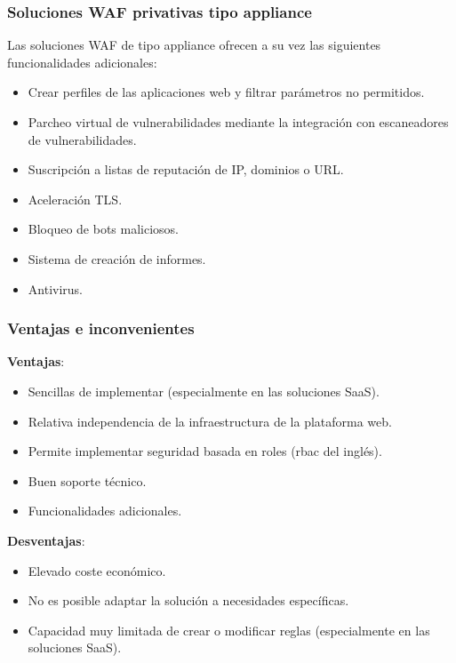 \begin{frame}[shrink]
  \frametitle{Soluciones WAF privativas tipo appliance}
  Las soluciones WAF de tipo appliance ofrecen a su vez las siguientes funcionalidades adicionales:
  \begin{itemize}
    \item Crear perfiles de las aplicaciones web y filtrar parámetros no permitidos.
    \item Parcheo virtual de vulnerabilidades mediante la integración con escaneadores de vulnerabilidades.
    \item Suscripción a listas de reputación de IP, dominios o URL.
    \item Aceleración TLS.
    \item Bloqueo de bots maliciosos.
    \item Sistema de creación de informes.
    \item Antivirus.
  \end{itemize}
\end{frame}

\begin{frame}[shrink]
  \frametitle{Ventajas e inconvenientes}
  {\bf Ventajas}:
  \begin{itemize}
    \item Sencillas de implementar (especialmente en las soluciones SaaS).
    \item Relativa independencia de la infraestructura de la plataforma web.
    \item Permite implementar seguridad basada en roles (\acrshort{rbac} del inglés).
    \item Buen soporte técnico.
    \item Funcionalidades adicionales.
  \end{itemize}
  {\bf Desventajas}:
  \begin{itemize}
    \item Elevado coste económico.
    \item No es posible adaptar la solución a necesidades específicas.
    \item Capacidad muy limitada de crear o modificar reglas (especialmente en las soluciones SaaS).
  \end{itemize}
\end{frame}


